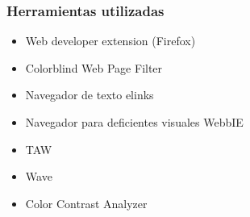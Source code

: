 \documentclass[a4paper,11pt]{article}
\begin{document}
\subsubsection{Herramientas utilizadas}
\begin{itemize}
\item Web developer extension (Firefox) \cite{webdevel}
\item Colorblind Web Page Filter \cite{colorblind}
\item Navegador de texto elinks \cite{elinks}
\item Navegador para deficientes visuales WebbIE \cite{webbie}
\item TAW \cite{taw}
\item Wave \cite{wave}
\item Color Contrast Analyzer \cite{colorcontrast}
\end{itemize}
\end{document}
